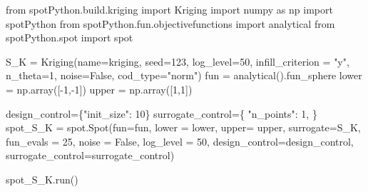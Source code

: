 \documentclass[
  letterpaper,
  DIV=11,
  numbers=noendperiod]{scrreprt}
\newenvironment{Shaded}{\begin{snugshade}}{\end{snugshade}}
\newcommand{\DecValTok}[1]{\textcolor[rgb]{0.68,0.00,0.00}{#1}}
\newcommand{\ImportTok}[1]{\textcolor[rgb]{0.00,0.46,0.62}{#1}}
\newcommand{\NormalTok}[1]{\textcolor[rgb]{0.00,0.23,0.31}{#1}}
\newcommand{\OperatorTok}[1]{\textcolor[rgb]{0.37,0.37,0.37}{#1}}
\newcommand{\StringTok}[1]{\textcolor[rgb]{0.13,0.47,0.30}{#1}}
\newcommand{\VariableTok}[1]{\textcolor[rgb]{0.07,0.07,0.07}{#1}}
\begin{document}
\begin{Shaded}
\begin{Highlighting}[]
\ImportTok{from}\NormalTok{ spotPython.build.kriging }\ImportTok{import}\NormalTok{ Kriging}
\ImportTok{import}\NormalTok{ numpy }\ImportTok{as}\NormalTok{ np}
\ImportTok{import}\NormalTok{ spotPython}
\ImportTok{from}\NormalTok{ spotPython.fun.objectivefunctions }\ImportTok{import}\NormalTok{ analytical}
\ImportTok{from}\NormalTok{ spotPython.spot }\ImportTok{import}\NormalTok{ spot}

\NormalTok{S\_K }\OperatorTok{=}\NormalTok{ Kriging(name}\OperatorTok{=}\StringTok{\textquotesingle{}kriging\textquotesingle{}}\NormalTok{,}
\NormalTok{              seed}\OperatorTok{=}\DecValTok{123}\NormalTok{,}
\NormalTok{              log\_level}\OperatorTok{=}\DecValTok{50}\NormalTok{,}
\NormalTok{              infill\_criterion }\OperatorTok{=} \StringTok{"y"}\NormalTok{,}
\NormalTok{              n\_theta}\OperatorTok{=}\DecValTok{1}\NormalTok{,}
\NormalTok{              noise}\OperatorTok{=}\VariableTok{False}\NormalTok{,}
\NormalTok{              cod\_type}\OperatorTok{=}\StringTok{"norm"}\NormalTok{)}
\NormalTok{fun }\OperatorTok{=}\NormalTok{ analytical().fun\_sphere}
\NormalTok{lower }\OperatorTok{=}\NormalTok{ np.array([}\OperatorTok{{-}}\DecValTok{1}\NormalTok{,}\OperatorTok{{-}}\DecValTok{1}\NormalTok{])}
\NormalTok{upper }\OperatorTok{=}\NormalTok{ np.array([}\DecValTok{1}\NormalTok{,}\DecValTok{1}\NormalTok{])}

\NormalTok{design\_control}\OperatorTok{=}\NormalTok{\{}\StringTok{"init\_size"}\NormalTok{: }\DecValTok{10}\NormalTok{\}}
\NormalTok{surrogate\_control}\OperatorTok{=}\NormalTok{\{}
            \StringTok{"n\_points"}\NormalTok{: }\DecValTok{1}\NormalTok{,}
\NormalTok{        \}}
\NormalTok{spot\_S\_K }\OperatorTok{=}\NormalTok{ spot.Spot(fun}\OperatorTok{=}\NormalTok{fun,}
\NormalTok{                     lower }\OperatorTok{=}\NormalTok{ lower,}
\NormalTok{                     upper}\OperatorTok{=}\NormalTok{ upper,}
\NormalTok{                     surrogate}\OperatorTok{=}\NormalTok{S\_K,}
\NormalTok{                     fun\_evals }\OperatorTok{=} \DecValTok{25}\NormalTok{,}
\NormalTok{                     noise }\OperatorTok{=} \VariableTok{False}\NormalTok{,}
\NormalTok{                     log\_level }\OperatorTok{=} \DecValTok{50}\NormalTok{,}
\NormalTok{                     design\_control}\OperatorTok{=}\NormalTok{design\_control,}
\NormalTok{                     surrogate\_control}\OperatorTok{=}\NormalTok{surrogate\_control)}

\NormalTok{spot\_S\_K.run()}
\end{Highlighting}
\end{Shaded}
\end{document}
